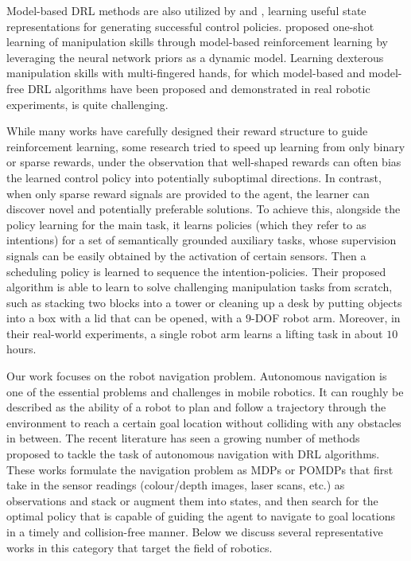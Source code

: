 Model-based DRL methods are also utilized by
\cite{finn2016deep} and \cite{tzeng2015towards},
learning useful state representations for generating successful control policies.
\cite{fu2016one} proposed one-shot learning of manipulation skills through model-based reinforcement learning by leveraging the neural network priors as a dynamic model.
Learning dexterous manipulation skills with multi-fingered hands,
for which model-based \cite{gupta2016learning, kumar2016optimal} and model-free \cite{popov2017data} DRL algorithms have been proposed and demonstrated in real robotic experiments,
is quite challenging.

While many works have carefully designed their reward structure to guide reinforcement learning,
some research \cite{martin2018learning} tried to speed up learning from only binary or sparse rewards,
under the observation that well-shaped rewards can often bias the learned control policy into potentially suboptimal directions.
In contrast, when only sparse reward signals are provided to the agent, the learner can discover novel and potentially preferable solutions.
To achieve this, alongside the policy learning for the main task, it learns policies (which they refer to as intentions) for a set of semantically grounded auxiliary tasks,
whose supervision signals can be easily obtained by the activation of certain sensors.
Then a scheduling policy is learned to sequence the intention-policies.
Their proposed algorithm is able to learn to solve challenging manipulation tasks from scratch,
such as stacking two blocks into a tower or cleaning up a desk by putting objects into a box with a lid that can be opened,
with a $9$-DOF robot arm. Moreover, in their real-world experiments, a single robot arm learns a lifting task in about $10$ hours.

Our work focuses on the robot navigation problem.
Autonomous navigation is one of the essential problems and challenges in mobile robotics.
It can roughly be described as the ability of a robot to plan and follow a trajectory through the environment to reach a certain goal location without colliding with any obstacles in between.
The recent literature has seen a growing number of methods proposed to tackle the task of autonomous navigation with DRL algorithms.
These works formulate the navigation problem as MDPs or POMDPs that first take in the sensor readings (colour/depth images, laser scans, etc.) as observations and stack or augment them into states,
and then search for the optimal policy that is capable of guiding the agent to navigate to goal locations in a timely and collision-free manner.
Below we discuss several representative works in this category that target the field of robotics.

